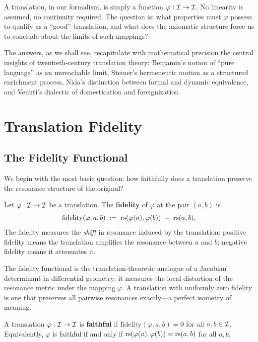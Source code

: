 A translation, in our formalism, is simply a function $\varphi : \mathcal{I} \to \mathcal{I}$.
No linearity is assumed, no continuity required.  The question is: what
properties must $\varphi$ possess to qualify as a ``good'' translation, and
what does the axiomatic structure force us to conclude about the limits of
such mappings?

The answers, as we shall see, recapitulate with mathematical precision the
central insights of twentieth-century translation theory: Benjamin's notion of
``pure language'' as an unreachable limit, Steiner's hermeneutic motion as a
structured enrichment process, Nida's distinction between formal and dynamic
equivalence, and Venuti's dialectic of domestication and foreignization.

\section{Translation Fidelity}
\label{sec:translation:fidelity}

\subsection{The Fidelity Functional}

We begin with the most basic question: how faithfully does a translation
preserve the resonance structure of the original?

\begin{definition}
\label{def:translation-fidelity}
Let $\varphi : \mathcal{I} \to \mathcal{I}$ be a translation.  The \textbf{fidelity} of
$\varphi$ at the pair $(a, b)$ is
\[
  \mathrm{fidelity}(\varphi, a, b)
    \;:=\; \mathrm{rs}(\varphi(a), \varphi(b)) \;-\; \mathrm{rs}(a, b).
\]
The fidelity measures the \emph{shift} in resonance induced by the
translation: positive fidelity means the translation amplifies the
resonance between $a$ and $b$; negative fidelity means it attenuates it.
\end{definition}

The fidelity functional is the translation-theoretic analogue of a
Jacobian determinant in differential geometry: it measures the local
distortion of the resonance metric under the mapping $\varphi$.  A
translation with uniformly zero fidelity is one that preserves all
pairwise resonances exactly---a perfect isometry of meaning.

\begin{definition}
\label{def:faithful}
A translation $\varphi : \mathcal{I} \to \mathcal{I}$ is \textbf{faithful} if
$\mathrm{fidelity}(\varphi, a, b) = 0$ for all $a, b \in \mathcal{I}$.
Equivalently, $\varphi$ is faithful if and only if
$\mathrm{rs}(\varphi(a), \varphi(b)) = \mathrm{rs}(a, b)$ for all $a, b$.
\end{definition}

